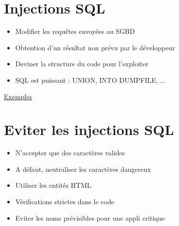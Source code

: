 \hypertarget{injections-sql}{%
\section{Injections SQL}\label{injections-sql}}

\begin{itemize}
\tightlist
\item
  Modifier les requêtes envoyées au SGBD
\item
  Obtention d'un résultat non prévu par le développeur
\item
  Deviner la structure du code pour l'exploiter
\item
  SQL est puissant : UNION, INTO DUMPFILE, \ldots{}
\end{itemize}

\href{https://fr.wikipedia.org/wiki/Injection_SQL}{Exemples}

\begin{otherlanguage}{english}

\begin{Shaded}
\begin{Highlighting}[]
 
   
\end{Highlighting}
\end{Shaded}

\end{otherlanguage}

\hypertarget{eviter-les-injections-sql}{%
\section{Eviter les injections SQL}\label{eviter-les-injections-sql}}

\begin{itemize}
\tightlist
\item
  N'accepter que des caractères valides
\item
  A défaut, neutraliser les caractères dangereux
\item
  Utiliser les entités HTML
\item
  Vérifications strictes dans le code
\item
  Eviter les noms prévisibles pour une appli critique
\end{itemize}

